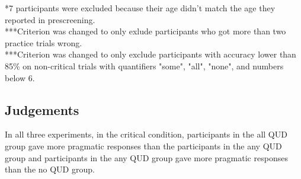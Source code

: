 \documentclass[12pt]{article}
\begin{document}
    *7 participants were excluded because their age didn't match the age they reported in prescreening. \\ 
    ***Criterion was changed to only exlude participants who got more than two practice trials wrong. \\
    ***Criterion was changed to only exclude participants with accuracy lower than 85\% on non-critical trials with quantifiers "some", "all", "none", and numbers below 6.

\subsection*{Judgements}

In all three experiments, in the critical condition, participants in the all QUD group gave more pragmatic responses than the participants in the any QUD group and participants in the any QUD group gave more pragmatic responses than the no QUD group.  
\\
\end{document}
